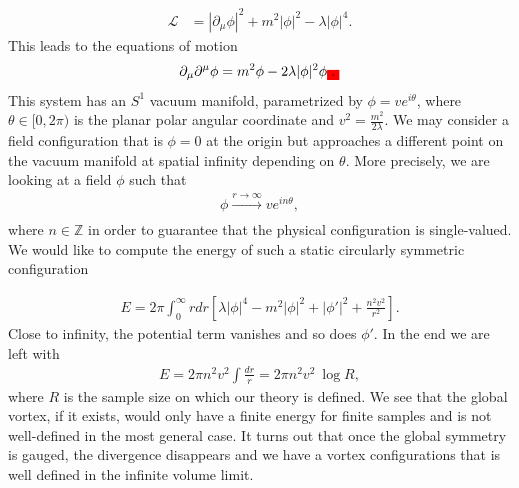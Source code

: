         \begin{align}
            \mathcal{L} &=  \left|\partial_{\mu} \phi \right|^2 + m^2 | \phi |^2 - \lambda |\phi|^4.
        \end{align}
    This leads to the equations of motion
    \begin{align}
        \partial_{\mu} \partial^{\mu} \phi = m^2 \phi - 2\lambda |\phi|^2 \phi\colorbox{red}{.}
    \end{align}
    This system has an $S^1$ vacuum manifold, parametrized by $\phi = v e^{i \theta}$, where $\theta \in [0,2\pi)$ is the planar polar angular coordinate and $v^2 = \frac{m^2}{2 \lambda}$. We may consider a field configuration that is $\phi=0$ at the origin but approaches a different point on the vacuum manifold at spatial infinity depending on $\theta$. More precisely, we are looking at a field $\phi$ such that
    \begin{align}
        \phi \xrightarrow[]{r\rightarrow \infty} v e^{i n\theta},
    \end{align}
    where $n \in \mathbb{Z}$ in order to guarantee that the physical configuration is single-valued.
    We would like to compute the energy of such a static circularly symmetric configuration

    \begin{align}
        E= 2 \pi \int_0^{\infty} r dr \left[\lambda |\phi|^4 - m^2 |\phi|^2 + |\phi'|^2 + \frac{n^2 v^2}{r^2} \right].
    \end{align}
    Close to infinity, the potential term vanishes and so does $\phi'$. In the end we are left with
    \begin{align}
        E = 2\pi n^2 v^2 \int \frac{dr}{r} =  2\pi n^2 v^2  \ \log R,
    \end{align}
    where $R$ is the sample size on which our theory is defined. We see that the global vortex, if it exists, would only have a finite energy for finite samples and is not well-defined in the most general case. It turns out that once the global symmetry is gauged, the divergence disappears and we have a vortex configurations that is well defined in the infinite volume limit.

